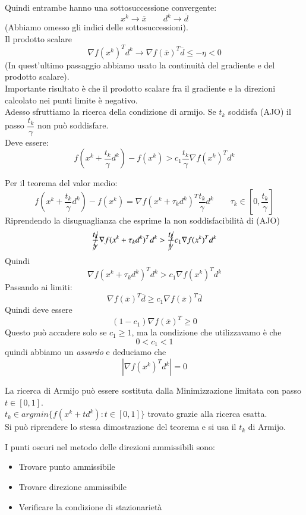 \begin{thproof}
  Quindi entrambe hanno una sottosuccessione convergente:
  $$ x^{k} \rightarrow \overline{x} \qquad d^{k} \rightarrow \overline{d}$$
  (Abbiamo omesso gli indici delle sottosuccessioni). \\
  Il prodotto scalare
  $$\nabla f(x^{k})^{T}d^{k} \rightarrow \nabla f(\overline{x})^{T}\overline{d}
  \leq - \eta < 0$$
  (In quest'ultimo passaggio abbiamo usato la continuit\`a del gradiente
  e del prodotto scalare).\\
  Importante risultato \`e che il prodotto scalare fra il gradiente e la
  direzioni calcolato nei punti limite \`e negativo.\\
  Adesso sfruttiamo la ricerca della condizione di armijo. Se $t_k$
  soddisfa (AJO) il passo $ \dfrac{t_k}{\gamma}$ non pu\`o soddisfare.\\
  Deve essere:
  $$ f(x^{k}+ \dfrac{t_k}{\gamma} d^{k}) -
  f(x^{k}) > c_1 \dfrac{t_k}{\gamma} \nabla f(x^{k})^{T}d^{k}$$
  
  Per il teorema del valor medio:
  $$ f(x^{k}+ \dfrac{t_k}{\gamma} d^{k}) - f(x^{k}) = 
  \nabla f(x^{k} + \tau_k d^k)^{T} \dfrac{t_k}{\gamma} d^{k} \qquad 
  \tau_k \in[0,\dfrac{t_k}{\gamma}]$$
  Riprendendo la disuguaglianza che esprime la non soddisfacibilit\`a di (AJO)
  $$ \cancel{\dfrac{t_k}{\gamma}} \nabla f(x^{k} + \tau_k d^k)^{T} d^{k} > 
  \cancel{\dfrac{t_k}{\gamma}} c_1 \nabla f(x^{k})^{T}d^{k} $$
  Quindi
  $$ \nabla f(x^{k} + \tau_k d^{k})^{T} d^{k} > c_1 \nabla f(x^{k})^{T}d^{k}$$
  Passando ai limiti:
  $$ \nabla f(\overline{x})^{T}\overline{d} \geq
  c_1 \nabla f(\overline{x})^{T} \overline{d} $$
  Quindi deve essere
  $$(1 -c_1)\nabla f(\overline{x})^{T} \geq 0$$
  Questo pu\`o accadere solo se $c_1 \geq 1$, ma la condizione
  che utilizzavamo \`e che
  $$ 0 < c_1 < 1 $$
  quindi abbiamo un \emph{assurdo} e deduciamo che 
  $$ | \nabla f(x^k)^{T} d^{k} | = 0 $$
\end{thproof}

\begin{observation}
La ricerca di Armijo pu\`o essere sostituta dalla Minimizzazione
limitata con passo $t \in[0,1]$. \\ $t_k \in argmin \{ f(x^{k} +
td^{k}): t \in [0,1]\}$ trovato grazie alla ricerca esatta.\\ Si pu\`o
riprendere lo stessa dimostrazione del teorema e si usa il $t_k$ di
Armijo.
\end{observation}

I punti oscuri nel metodo delle direzioni ammissibili sono:
\begin{itemize}
  \item Trovare punto ammissibile
  \item Trovare direzione ammissibile
  \item Verificare la condizione di stazionariet\`a
\end{itemize}


